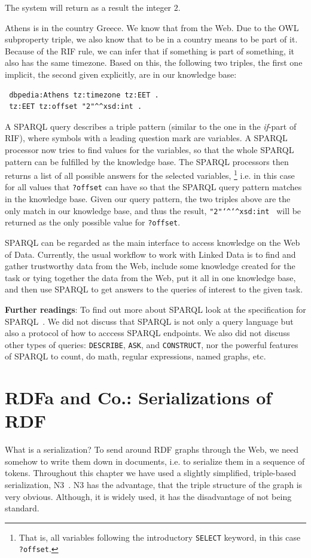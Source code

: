 The system will return as a result the integer $2$.

Athens is in the country Greece. We know that from the Web.
Due to the OWL subproperty triple, we also know that to be in a country means to be part of it.
Because of the RIF rule, we can infer that if something is part of something, it also has the same timezone.
Based on this, the following two triples, the first one implicit, the second given explicitly, are in our knowledge base:

\begin{verbatim}
 dbpedia:Athens tz:timezone tz:EET .
 tz:EET tz:offset "2"^^xsd:int .
\end{verbatim}

A SPARQL query describes a triple pattern (similar to the one in the \textit{if}-part of RIF),
where symbols with a leading question mark are variables.
A SPARQL processor now tries to find values for the variables, so that the whole SPARQL pattern can be fulfilled by the knowledge base.
The SPARQL processors then returns a list of all possible answers for the selected variables,%
\footnote{That is, all variables following the introductory \texttt{SELECT} keyword, in this case \texttt{?offset}.}
i.e. in this case for all values that \texttt{?offset} can have so that the SPARQL query pattern matches in the knowledge base.
Given our query pattern, the two triples above are the only match in our knowledge base, and thus the result, \texttt{"2"\texttt{\char`\^}\texttt{\char`\^}xsd:int } will be returned as the only possible value for \texttt{?offset}.

SPARQL can be regarded as the main interface to access knowledge on the Web of Data.
Currently, the usual workflow to work with Linked Data is to find and gather trustworthy data from the Web, include some knowledge created for the task or tying together the data from the Web, put it all in one knowledge base, and then use SPARQL to get answers to the queries of interest to the given task.

\medskip

\textbf{Further readings}:
To find out more about SPARQL look at the specification for SPARQL~\cite{sparql}.
We did not discuss that SPARQL is not only a query language but also a protocol of how to acccess SPARQL endpoints.
We also did not discuss other types of queries: \texttt{DESCRIBE}, \texttt{ASK}, and \texttt{CONSTRUCT}, nor the powerful features of SPARQL to count, do math, regular expressions, named graphs, etc.

\section{RDFa and Co.: Serializations of RDF}
\label{rdfa}
What is a serialization?
To send around RDF graphs through the Web, we need somehow to write them down in documents, i.e. to serialize them in a sequence of tokens.
Throughout this chapter we have used a slightly simplified, triple-based serialization, N3~\cite{n3}.
N3 has the advantage, that the triple structure of the graph is very obvious.
Although, it is widely used, it has the disadvantage of not being standard.

